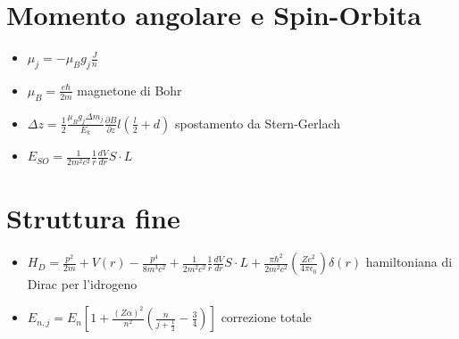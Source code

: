 \documentclass[a4paper]{article}
\begin{document}
    \section{Momento angolare e Spin-Orbita}
        \begin{itemize}
            \item $\mu_j=-\mu_Bg_j\frac{J}{n}$
            \item $\mu_B=\frac{e\hbar}{2m}$ magnetone di Bohr
            \item $\Delta z= \frac{1}{2}\frac{\mu_Bg_j\Delta m_j}{E_k}\frac{\partial B}{\partial z}l\left(\frac{l}{2}+d\right)$ spostamento da Stern-Gerlach
            \item $E_{SO}=\frac{1}{2m^2c^2}\frac{1}{r}\frac{dV}{dr}S\cdot L$
        \end{itemize}
    \section{Struttura fine}
        \begin{itemize}
            \item $H_D=\frac{p^2}{2m}+V(r)-\frac{p^4}{8m^3c^2}+\frac{1}{2m^2c^2}\frac{1}{r}\frac{dV}{dr}S\cdot L+\frac{\pi\hbar^2}{2m^2c^2}\left(\frac{Ze^2}{4\pi\epsilon_0}\right)\delta(r)$ hamiltoniana di Dirac per l'idrogeno
            \item $E_{n,j}=E_n\left[1+\frac{\left(Z\alpha\right)^2}{n^2}\left(\frac{n}{j+\frac{1}{2}}-\frac{3}{4}\right)\right]$ correzione totale
        \end{itemize}
\end{document}
